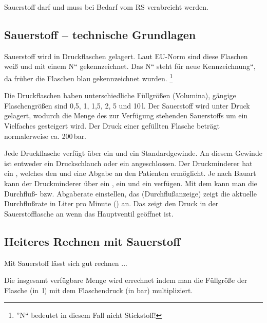 Sauerstoff darf und muss bei Bedarf vom RS verabreicht werden.

% 

\subsection{Sauerstoff -- technische Grundlagen}
Sauerstoff wird in Druckflaschen  gelagert. Laut EU-Norm sind diese
Flaschen wei{\ss} und mit einem {\quotedblbase}N{\textquotedblleft}
gekennzeichnet. Das {\quotedblbase}N{\textquotedblleft} steht für
{\quotedblbase}neue Kennzeichnung{\textquotedblleft}, da früher die
Flaschen blau gekennzeichnet wurden. \footnote{{\textquotedblright}N{\textquotedblleft} bedeutet in diesem Fall nicht Stickstoff!}

Die Druckflaschen haben unterschiedliche Füllgr\"o{\ss}en (Volumina),
gängige Flaschengr\"o{\ss}en sind 0,5, 1, 1,5, 2, 5 und
10\,l. Der Sauerstoff wird unter Druck gelagert, wodurch die
Menge des zur Verfügung stehenden Sauerstoffs um ein Vielfaches
gesteigert wird. Der Druck einer gefüllten Flasche beträgt
normalerweise ca. 200\,bar. 

Jede Druckflasche verfügt über ein  und
ein Standardgewinde. An diesem Gewinde ist entweder ein
Druckschlauch oder ein  angeschlossen. Der 
Druckminderer hat ein , welches den
 und eine Abgabe an den Patienten
erm\"oglicht. Je nach Bauart kann der Druckminderer über
ein , ein  und ein
 verfügen. Mit dem  kann man
die Durchflu{\ss}- bzw. Abgaberate ein\-stellen, das
 (Durchflu{\ss}anzeige) zeigt die aktuelle
Durchflu{\ss}rate in Liter pro Minute (\gLMin) an. Das
 zeigt den Druck in der Sauerstofflasche an
wenn das Haupt\-ventil ge\"offnet ist.

\subsection{Heiteres Rechnen mit Sauerstoff}

Mit Sauerstoff lässt sich gut rechnen ...

Die insgesamt verfügbare Menge wird errechnet indem man
die Füllgr\"o{\ss}e der Flasche (in~l) mit dem
Flaschendruck (in bar) multipliziert.

